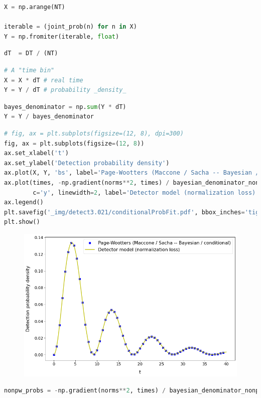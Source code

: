 \begin{lstlisting}[language=Python]
X = np.arange(NT)

iterable = (joint_prob(n) for n in X)
Y = np.fromiter(iterable, float)
\end{lstlisting}

\begin{lstlisting}[language=Python]
dT  = DT / (NT)
\end{lstlisting}

\begin{lstlisting}[language=Python]
# A "time bin"
X = X * dT # real time
Y = Y / dT # probability _density_
\end{lstlisting}

\begin{lstlisting}[language=Python]
bayes_denominator = np.sum(Y * dT)
Y = Y / bayes_denominator
\end{lstlisting}

\begin{lstlisting}[language=Python]
# fig, ax = plt.subplots(figsize=(12, 8), dpi=300)
fig, ax = plt.subplots(figsize=(12, 8))
ax.set_xlabel('t')
ax.set_ylabel('Detection probability density')
ax.plot(X, Y, 'bs', label='Page-Wootters (Maccone / Sacha -- Bayesian / conditional)')
ax.plot(times, -np.gradient(norms**2, times) / bayesian_denominator_nonpw,
        c='y', linewidth=2, label='Detector model (normalization loss)')
ax.legend()
plt.savefig('_img/detect3.021/conditionalProbFit.pdf', bbox_inches='tight', pad_inches=0)
plt.show()
\end{lstlisting}

\begin{figure}[h!]
\centering
\includegraphics[width=0.66\linewidth]{tex/appendix/nb/jupyter/3lev/output_79_0.png}

\end{figure}

\begin{lstlisting}[language=Python]
nonpw_probs = -np.gradient(norms**2, times) / bayesian_denominator_nonpw
\end{lstlisting}

